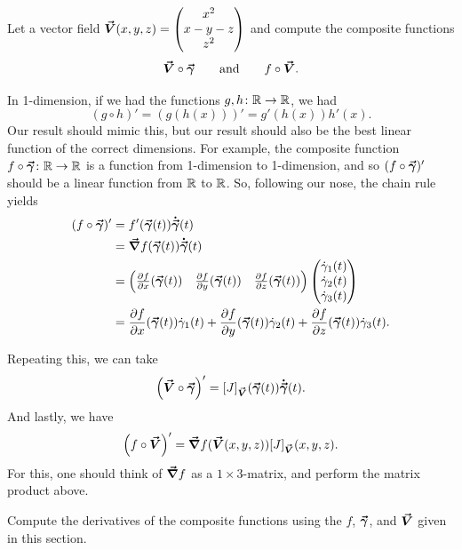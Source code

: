      	\begin{exercise}
     		Let a vector field $\boldsymbol{\vec{V}}(x,y,z) = \begin{pmatrix} x^2 \\ x-y-z \\ z^2 \end{pmatrix}$ and compute the composite functions 
     		\[
     		\boldsymbol{\vec{V}}\circ \boldsymbol{\vec{\gamma}} \qquad \textrm{and} \qquad f\circ \boldsymbol{\vec{V}}.
     		\]
     	\end{exercise}
     	
     	In 1-dimension, if we had the functions $g,h \colon \mathbb{R} \to \mathbb{R}$, we had
     	\[
     	(g\circ h)'=\left(g(h(x))\right)' = g'(h(x))h'(x).
     	\]
     	Our result should mimic this, but our result should also be the best linear function of the correct dimensions.  For example, the composite function $f\circ \boldsymbol{\vec{\gamma}} \colon \mathbb{R} \to \mathbb{R}$ is a function from 1-dimension to 1-dimension, and so $(f\circ \boldsymbol{\vec{\gamma}})'$ should be a linear function from $\mathbb{R}$ to $\mathbb{R}$. So, following our nose, the chain rule yields
     	\begin{align*}
     		(f\circ \boldsymbol{\vec{\gamma}})' &= f'(\boldsymbol{\vec{\gamma}}(t))\boldsymbol{\dot{\vec{\gamma}}}(t)\\
     		&= \boldsymbol{\vec{\nabla}} f(\boldsymbol{\vec{\gamma}}(t)) \boldsymbol{\dot{\vec{\gamma}}}(t)\\
     		&= \begin{pmatrix} \frac{\partial f}{\partial x}(\boldsymbol{\vec{\gamma}}(t)) &\frac{\partial f}{\partial y}(\boldsymbol{\vec{\gamma}}(t)) & \frac{\partial f}{\partial z}(\boldsymbol{\vec{\gamma}}(t)) \end{pmatrix} \begin{pmatrix} \dot{\gamma}_1(t) \\ \dot{\gamma}_2(t) \\ \dot{\gamma}_3(t) \end{pmatrix}\\
     		&= \frac{\partial f}{\partial x}(\boldsymbol{\vec{\gamma}}(t)) \dot{\gamma}_1(t) + \frac{\partial f}{\partial y}(\boldsymbol{\vec{\gamma}}(t)) \dot{\gamma}_2(t) +\frac{\partial f}{\partial z}(\boldsymbol{\vec{\gamma}}(t)) \dot{\gamma}_3(t) .
     \end{align*}
 
 	Repeating this, we can take
 	\begin{align*}
 		\left(\boldsymbol{\vec{V}} \circ \boldsymbol{\vec{\gamma}}\right)' = [J]_{\boldsymbol{\vec{V}}}(\boldsymbol{\vec{\gamma}}(t)) \boldsymbol{\dot{\vec{\gamma}}}(t).
 	\end{align*}
 	And lastly, we have
 	\[
 	\left(f \circ \boldsymbol{\vec{V}}\right)' = \boldsymbol{\vec{\nabla}} f(\boldsymbol{\vec{V}}(x,y,z)) [J]_{\boldsymbol{\vec{V}}}(x,y,z).
 	\]
 	For this, one should think of $\boldsymbol{\vec{\nabla}} f$ as a $1\times 3$-matrix, and perform the matrix product above.
 	
 	\begin{exercise}
 		Compute the derivatives of the composite functions using the $f$, $\boldsymbol{\vec{\gamma}}$, and $\boldsymbol{\vec{V}}$ given in this section.
 	\end{exercise}
     

